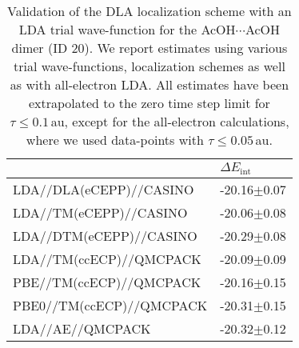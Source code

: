 \begin{table}[h!]
\caption{\label{tab:acetic_acid_validation}Validation of the DLA localization scheme with an LDA trial wave-function for the AcOH$\cdots$AcOH dimer (ID 20). We report estimates using various trial wave-functions, localization schemes as well as with all-electron LDA. All estimates have been extrapolated to the zero time step limit for $\tau{\leq}0.1\,$au, except for the all-electron calculations, where we used data-points with $\tau{\leq}0.05\,$au.}
\begin{adjustbox}{center}
\begin{tabular}{ll}
\toprule
 & $\Delta E_\text{int}$ \\ 
\midrule
LDA//DLA(eCEPP)//CASINO & -20.16$\pm$0.07 \\
LDA//TM(eCEPP)//CASINO & -20.06$\pm$0.08 \\
LDA//DTM(eCEPP)//CASINO & -20.29$\pm$0.08 \\
LDA//TM(ccECP)//QMCPACK & -20.09$\pm$0.09 \\
PBE//TM(ccECP)//QMCPACK & -20.16$\pm$0.15 \\
PBE0//TM(ccECP)//QMCPACK & -20.31$\pm$0.15 \\
LDA//AE//QMCPACK & -20.32$\pm$0.12 \\
\bottomrule
\end{tabular}
\end{adjustbox}
\end{table}